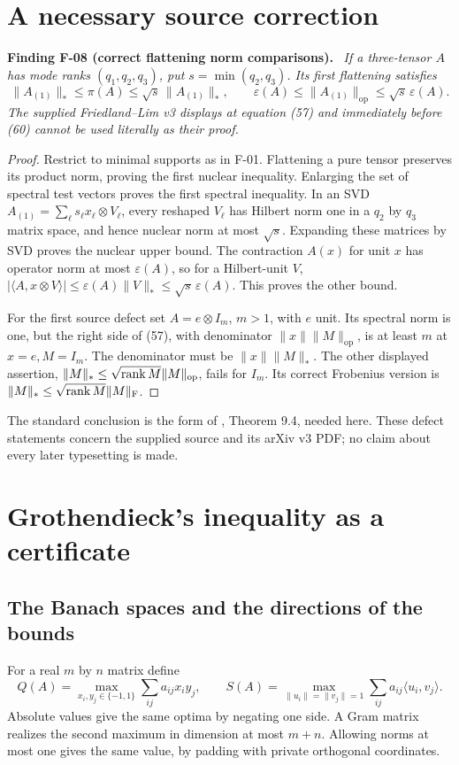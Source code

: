 \documentclass[11pt]{article}
\newcommand{\HS}[1]{\lVert #1\rVert_{\mathrm F}}
\newcommand{\op}[1]{\lVert #1\rVert_{\mathrm{op}}}
\newcommand{\nuc}[1]{\lVert #1\rVert_*}
\newcommand{\eps}{\varepsilon}
\newenvironment{finding}[2]{\par\medskip\noindent\textbf{Finding #1 (#2).}\ \itshape}{\par\medskip}
\begin{document}
\section{A necessary source correction}
\begin{finding}{F-08}{correct flattening norm comparisons}
If a three-tensor $A$ has mode ranks $(q_1,q_2,q_3)$, put
$s=\min(q_2,q_3)$. Its first flattening satisfies
\[
 \nuc{A_{(1)}}\leq\pi(A)\leq\sqrt s\,\nuc{A_{(1)}},
 \qquad
 \eps(A)\leq\op{A_{(1)}}\leq\sqrt s\,\eps(A).
\]
The supplied Friedland--Lim v3 displays at equation (57) and immediately
before (60) cannot be used literally as their proof.
\end{finding}
\begin{proof}
Restrict to minimal supports as in F-01. Flattening a pure tensor
preserves its product norm, proving the first nuclear inequality.
Enlarging the set of spectral test vectors proves the first spectral
inequality. In an SVD
$A_{(1)}=\sum_\ell s_\ell x_\ell\otimes V_\ell$, every reshaped
$V_\ell$ has Hilbert norm one in a $q_2$ by $q_3$ matrix space,
and hence nuclear norm at most $\sqrt s$. Expanding these matrices
by SVD proves the nuclear upper bound. The contraction $A(x)$
for unit $x$ has operator norm at most $\eps(A)$, so for a
Hilbert-unit $V$,
$|\langle A,x\otimes V\rangle|\leq\eps(A)\nuc V
\leq\sqrt s\,\eps(A)$. This proves the other bound.

For the first source defect set $A=e\otimes I_m$, $m>1$, with $e$
unit. Its spectral norm is one, but the right side of (57), with
denominator $\|x\|\op M$, is at least $m$ at $x=e,M=I_m$.
The denominator must be $\|x\|\nuc M$.
The other displayed assertion,
$\nuc M\leq\sqrt{\rank M}\op M$, fails for $I_m$.
Its correct Frobenius version is
$\nuc M\leq\sqrt{\rank M}\HS M$.
\end{proof}
The standard conclusion is the form of \cite{FL}, Theorem 9.4,
needed here. These defect statements concern the supplied source and
its arXiv v3 PDF; no claim about every later typesetting is made.

\section{Grothendieck's inequality as a certificate}
\subsection{The Banach spaces and the directions of the bounds}
For a real $m$ by $n$ matrix define
\[
 Q(A)=\max_{x_i,y_j\in\{-1,1\}}\sum_{ij}a_{ij}x_i y_j,\qquad
 S(A)=\max_{\|u_i\|=\|v_j\|=1}\sum_{ij}a_{ij}\langle u_i,v_j\rangle .
\]
Absolute values give the same optima by negating one side. A Gram
matrix realizes the second maximum in dimension at most $m+n$.
Allowing norms at most one gives the same value, by padding with
private orthogonal coordinates.
\end{document}
